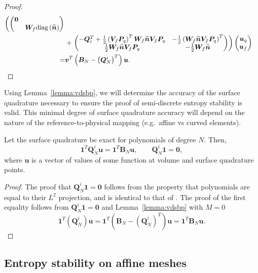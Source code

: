 \documentclass[review]{siamart0216}
\theoremstyle{assumption}
\renewcommand{\hat}[1]{\widehat{#1}}
\newcommand{\LRp}[1]{\left( #1 \right)}
\newcommand{\diag}[1]{{\rm diag}\LRp{#1}}
\begin{document}
\begin{proof}
\begin{align*}
\left(\begin{pmatrix}
\bm{0}& \\
& \bm{W}_f\diag{\hat{\bm{n}}}
\end{pmatrix}\right.\\
&+
\left.\begin{pmatrix}
-\bm{Q}_i^T + \frac{1}{2}\LRp{\bm{V}_f\bm{P}_q}^T\bm{W}_f\hat{\bm{n}} \bm{V}_f\bm{P}_q & -\frac{1}{2} \LRp{\bm{W}_f\hat{\bm{n}} \bm{V}_f\bm{P}_q}^T\\
\frac{1}{2}\bm{W}_f\hat{\bm{n}} \bm{V}_f\bm{P}_q & -\frac{1}{2}\bm{W}_f\hat{\bm{n}}
\end{pmatrix}  \right)
\begin{pmatrix} \bm{u}_q\\ \bm{u}_f\end{pmatrix}\\
=& \bm{v}^T\LRp{\bm{B}_N - \LRp{\bm{Q}^i_N}^T}\bm{u}.
\end{align*}
\end{proof}
Using Lemma~\ref{lemma:vdsbp}, we will determine the accuracy of the surface quadrature necessary to ensure the proof of semi-discrete entropy stability is valid.  This minimal degree of surface quadrature accuracy will depend on the nature of the reference-to-physical mapping (e.g.\ affine vs curved elements).

\begin{corollary}
\label{lemma:sbpcor}
Let the surface quadrature be exact for polynomials of degree $N$.  Then, 
\[
\bm{1}^T\bm{Q}^i_N\bm{u} = \bm{1}^T\bm{B}_N\bm{u}, \qquad \bm{Q}^i_N\bm{1} = \bm{0},
\]
where $\bm{u}$ is a vector of values of some function at volume and surface quadrature points. %
\end{corollary}
\begin{proof}
The proof that $\bm{Q}^i_N \bm{1} = \bm{0}$ follows from the property that polynomials are equal to their $L^2$ projection, and is identical to that of \cite{chan2017discretely,chan2018discretely}.     The proof of the first equality follows from $\bm{Q}^i_N \bm{1} = \bm{0}$ and Lemma~\ref{lemma:vdsbp} with $M=0$
\[
\bm{1}^T\LRp{\bm{Q}^i_N}\bm{u} = \bm{1}^T\LRp{\bm{B}_N - \LRp{\bm{Q}^i_N}^T}\bm{u} = \bm{1}^T{\bm{B}_N}\bm{u}.
\]
\end{proof}
\subsection{Entropy stability on affine meshes}
\end{document}
